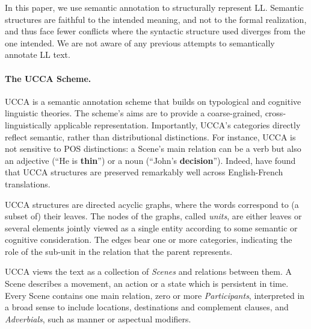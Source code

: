 \documentclass[a4paper, 11pt]{article}
\newcommand{\com}[1]{}
\begin{document}
In this paper, we use semantic annotation to structurally
represent LL. Semantic structures are faithful to the intended
meaning, and not to the formal realization, and thus face
fewer conflicts where the syntactic structure used diverges from
the one intended. We are not aware of any previous attempts to semantically
annotate LL text.


\paragraph{The UCCA Scheme.}\label{sec:ucca}
UCCA is a semantic annotation scheme that builds on
typological and cognitive linguistic theories.
The scheme's aims are to provide a coarse-grained, cross-linguistically
applicable representation.
Importantly, UCCA's categories directly reflect semantic, rather than
distributional distinctions.
For instance, UCCA is not sensitive to POS distinctions:
a Scene's main relation can be a verb but also an adjective
(``He is {\bf thin}'') or a noun (``John's {\bf decision}'').
Indeed,  have found that UCCA structures are
preserved remarkably well across English-French translations. 

UCCA structures are directed acyclic graphs, where the words
correspond to (a subset of) their leaves.
The nodes of the graphs, called {\it units}, are either leaves or several elements jointly
viewed as a single entity according to some semantic or cognitive consideration.
The edges bear one or more categories, indicating the role of 
the sub-unit in the relation that the parent represents.

UCCA views the text as a collection of {\it Scenes} and relations between them.
A Scene describes a movement, 
an action or a state which is persistent in time.
Every Scene contains one main relation, 
zero or more {\it Participants}, 
interpreted in a broad sense to include locations, destinations and complement clauses,
and {\it Adverbials}, such as manner or aspectual modifiers.

\com{
\begin{figure}[t]
				\begin{tikzpicture}[sibling distance=10mm, level distance=10mm, ->,
				every node/.append style={midway},
				every circle node/.append style={fill=black}]
				{
					\node (Source) [circle] {}
					child {node (He) {He} edge from parent node[left] {\scriptsize A}
					}
					child {node (gave) {gve} edge from parent node[right] {\scriptsize A}}
					child {node (an apple) [circle] {}
						{
							child {node (an) {an} edge from parent node[left] {\scriptsize E}}
							child {node (apple){apple} edge from parent node[right] {\scriptsize C}}
						} edge from parent node[right] {\scriptsize P} }
					;}
					\end{tikzpicture}

		\end{figure}}
		
\end{document}

